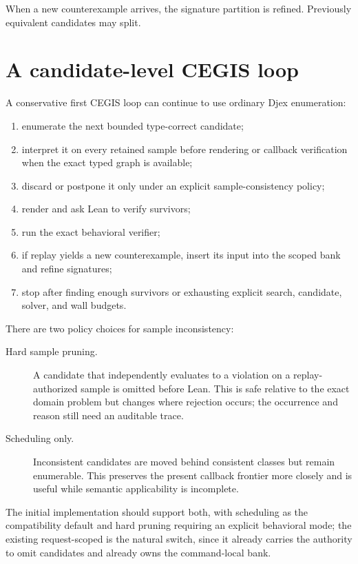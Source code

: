 \documentclass[10pt,letterpaper,oneside]{report}
\newcommand{\code}[1]{\texttt{\detokenize{#1}}}
\begin{document}
When a new counterexample arrives, the signature partition is refined. Previously equivalent candidates may split.

\section{A candidate-level CEGIS loop}

A conservative first CEGIS loop can continue to use ordinary Djex enumeration:

\begin{enumerate}
\item enumerate the next bounded type-correct candidate;
\item interpret it on every retained sample before rendering or callback verification when the exact typed graph is available;
\item discard or postpone it only under an explicit sample-consistency policy;
\item render and ask Lean to verify survivors;
\item run the exact behavioral verifier;
\item if replay yields a new counterexample, insert its input into the scoped bank and refine signatures;
\item stop after finding enough survivors or exhausting explicit search, candidate, solver, and wall budgets.
\end{enumerate}

There are two policy choices for sample inconsistency:

\begin{description}
\item[Hard sample pruning.] A candidate that independently evaluates to a violation on a replay-authorized sample is omitted before Lean. This is safe relative to the exact domain problem but changes where rejection occurs; the occurrence and reason still need an auditable trace.

\item[Scheduling only.] Inconsistent candidates are moved behind consistent classes but remain enumerable. This preserves the present callback frontier more closely and is useful while semantic applicability is incomplete.
\end{description}

The initial implementation should support both, with scheduling as the compatibility default and hard pruning requiring an explicit behavioral mode; the existing request-scoped \code{--behavior-mode filter} is the natural switch, since it already carries the authority to omit candidates and already owns the command-local bank.
\end{document}
